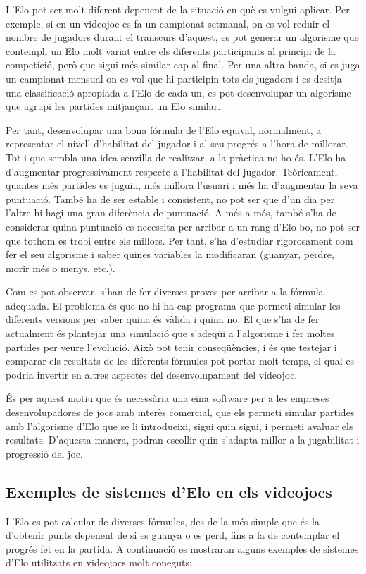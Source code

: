 \documentclass[a4paper]{article}
\begin{document}
L'Elo pot ser molt diferent depenent de la situació en què es vulgui aplicar. Per exemple, si en un videojoc es fa un campionat setmanal, on es vol reduir el nombre de jugadors durant el transcurs d'aquest, es pot generar un algorisme que contempli un Elo molt variat entre els diferents participants al principi de la competició, però que sigui més similar cap al final. Per una altra banda, si es juga un campionat mensual on es vol que hi participin tots els jugadors i es desitja una classificació apropiada a l'Elo de cada un, es pot desenvolupar un algorisme que agrupi les partides mitjançant un Elo similar.

Per tant, desenvolupar una bona fórmula de l'Elo equival, normalment, a representar el nivell d'habilitat del jugador i al seu progrés a l'hora de millorar. Tot i que sembla una idea senzilla de realitzar, a la pràctica no ho és. L'Elo ha d'augmentar progressivament respecte a l'habilitat del jugador. Teòricament, quantes més partides es juguin, més millora l'usuari i més ha d'augmentar la seva puntuació. També ha de ser estable i consistent, no pot ser que d'un dia per l'altre hi hagi una gran diferència de puntuació. A més a més, també s'ha de considerar quina puntuació es necessita per arribar a un rang d'Elo bo, no pot ser que tothom es trobi entre els millors. Per tant, s'ha d'estudiar rigorosament com fer el seu algorisme i saber quines variables la modificaran (guanyar, perdre, morir més o menys, etc.).

Com es pot observar, s'han de fer diverses proves per arribar a la fórmula adequada. El problema és que no hi ha cap programa que permeti simular les diferents versions per saber quina és vàlida i quina no. El que s'ha de fer actualment és plantejar una simulació que s'adeqüi a l'algorisme i fer moltes partides per veure l'evolució. Això pot tenir conseqüències, i és que testejar i comparar els resultats de les diferents fórmules pot portar molt temps, el qual es podria invertir en altres aspectes del desenvolupament del videojoc. 

És per aquest motiu que és necessària una eina software per a les empreses desenvolupadores de jocs amb interès comercial, que els permeti simular partides amb l'algorisme d'Elo que se li introdueixi, sigui quin sigui, i permeti avaluar els resultats. D'aquesta manera, podran escollir quin s'adapta millor a la jugabilitat i progressió del joc.

\newpage
\subsection{Exemples de sistemes d'Elo en els videojocs}
L'Elo es pot calcular de diverses fórmules, des de la més simple que és la d'obtenir punts depenent de si es guanya o es perd, fins a la de contemplar el progrés fet en la partida. A continuació es mostraran alguns exemples de sistemes d'Elo utilitzats en videojocs molt coneguts:
\end{document}
